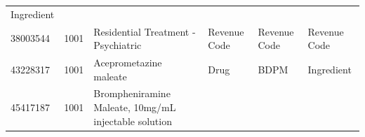\documentclass[10.5pt]{book}
\theoremstyle{definition}
\theoremstyle{definition}
\theoremstyle{definition}
\theoremstyle{remark}
\begin{document}
\begin{longtable}[]{@{}llllll@{}}
\begin{minipage}[t]{0.14\columnwidth}
Ingredient\strut
\end{minipage}\tabularnewline
\begin{minipage}[t]{0.13\columnwidth}\raggedright\strut
38003544\strut
\end{minipage} & \begin{minipage}[t]{0.07\columnwidth}\raggedright\strut
1001\strut
\end{minipage} & \begin{minipage}[t]{0.16\columnwidth}\raggedright\strut
Residential Treatment - Psychiatric\strut
\end{minipage} & \begin{minipage}[t]{0.14\columnwidth}\raggedright\strut
Revenue Code\strut
\end{minipage} & \begin{minipage}[t]{0.14\columnwidth}\raggedright\strut
Revenue Code\strut
\end{minipage} & \begin{minipage}[t]{0.14\columnwidth}\raggedright\strut
Revenue Code\strut
\end{minipage}\tabularnewline
\begin{minipage}[t]{0.13\columnwidth}\raggedright\strut
43228317\strut
\end{minipage} & \begin{minipage}[t]{0.07\columnwidth}\raggedright\strut
1001\strut
\end{minipage} & \begin{minipage}[t]{0.16\columnwidth}\raggedright\strut
Aceprometazine maleate\strut
\end{minipage} & \begin{minipage}[t]{0.14\columnwidth}\raggedright\strut
Drug\strut
\end{minipage} & \begin{minipage}[t]{0.14\columnwidth}\raggedright\strut
BDPM\strut
\end{minipage} & \begin{minipage}[t]{0.14\columnwidth}\raggedright\strut
Ingredient\strut
\end{minipage}\tabularnewline
\begin{minipage}[t]{0.13\columnwidth}\raggedright\strut
45417187\strut
\end{minipage} & \begin{minipage}[t]{0.07\columnwidth}\raggedright\strut
1001\strut
\end{minipage} & \begin{minipage}[t]{0.16\columnwidth}\raggedright\strut
Brompheniramine Maleate, 10mg/mL injectable solution\strut

\end{minipage}
\end{longtable}
\end{document}
